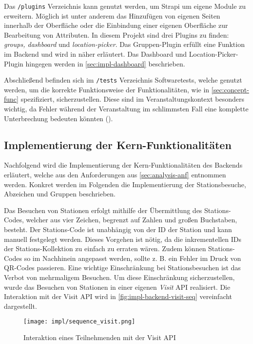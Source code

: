 Das \lstinline[style=code, style=inline]{/plugins} Verzeichnis kann genutzt
werden, um Strapi um eigene Module zu erweitern. Möglich ist unter anderem das
Hinzufügen von eigenen Seiten innerhalb der Oberfläche oder die Einbindung einer
eigenen Oberfläche zur Bearbeitung von Attributen. In diesem Projekt sind drei
Plugins zu finden: \textit{groups, dashboard} und \textit{location-picker}. Das
Gruppen-Plugin erfüllt eine Funktion im Backend und wird in
 näher erläutert. Das Dash\-board und
Location-Picker-Plugin hingegen werden in \autoref{sec:impl-dashboard}
beschrieben.

Abschließend befinden sich im \lstinline[style=code, style=inline]{/tests}
Verzeichnis Softwaretests, welche genutzt werden, um die korrekte Funktionsweise
der Funktionalitäten, wie in \autoref{sec:concept-func} spezifiziert,
sicherzustellen. Diese sind im Veranstaltungskontext besonders wichtig, da
Fehler während der Veranstaltung im schlimmsten Fall eine komplette
Unterbrechung bedeuten könnten ().

\subsection{Implementierung der Kern-Funktionalitäten} \label{ssec:impl-backend-func}

Nachfolgend wird die Implementierung der Kern-Funktionalitäten des Backends
erläutert, welche aus den Anforderungen aus \autoref{sec:analysis-anf} entnommen
werden. Konkret werden im Folgenden die Implementierung der Stationsbesuche,
Abzeichen und Gruppen beschrieben.

Das Besuchen von Stationen erfolgt mithilfe der Übermittlung des Stations-Codes,
welcher aus vier Zeichen, begrenzt auf Zahlen und großen Buchstaben, besteht.
Der Stations-Code ist unabhängig von der ID der Station und kann manuell
festgelegt werden. Dieses Vorgehen ist nötig, da die inkrementellen IDs der
Stations-Kollektion zu einfach zu erraten wären. Zudem können Stations-Codes so
im Nachhinein angepasst werden, sollte z. B. ein Fehler im Druck von QR-Codes
passieren. Eine wichtige Einschränkung bei Stationsbesuchen ist das Verbot von
mehrmaligem Besuchen. Um diese Einschränkung sicherzustellen, wurde das Besuchen
von Stationen in einer eigenen \textit{Visit} API realisiert. Die Interaktion
mit der Visit API wird in \autoref{fig:impl-backend-visit-seq} vereinfacht dargestellt.

\begin{figure}[htpb]
    \centering
    \texttt{[image: impl/sequence\_visit.png]}
    \caption{Interaktion eines Teilnehmenden mit der Visit API}
    \label{fig:impl-backend-visit-seq}
\end{figure}


